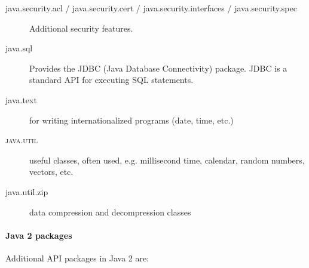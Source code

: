 \begin{description}
\item[java.security.acl / java.security.cert / java.security.interfaces / java.security.spec] Additional security features.
\item[java.sql] Provides the JDBC (Java Database Connectivity) package. JDBC is a standard API for executing SQL statements.
\item[java.text] for writing internationalized programs (date, time, etc.)
\item[\textsc{java.util}] useful classes, often used, e.g. millisecond time,
  calendar, random numbers, vectors, etc.
\item[java.util.zip] data compression and decompression classes
\end{description}

\paragraph{Java 2 packages}
Additional API packages in Java 2 are:
